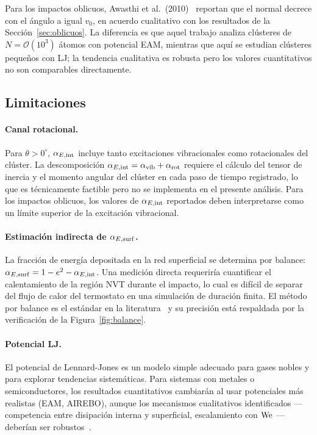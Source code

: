 Para los impactos oblicuos, Awasthi et al.\ (2010)~\cite{awasthi2010} reportan
que el \COR{} normal decrece con el ángulo a igual $v_0$, en acuerdo cualitativo
con los resultados de la Sección~\ref{sec:oblicuos}. La diferencia es que aquel
trabajo analiza clústeres de $N=\mathcal{O}(10^3)$ átomos con potencial EAM,
mientras que aquí se estudian clústeres pequeños con LJ; la tendencia cualitativa
es robusta pero los valores cuantitativos no son comparables directamente.

\subsection{Limitaciones}
\label{sec:limitaciones}

\paragraph{Canal rotacional.}
Para $\theta > 0^\circ$, $\alpha_{E,\mathrm{int}}$ incluye tanto excitaciones vibracionales
como rotacionales del clúster. La descomposición $\alpha_{E,\mathrm{int}} = \alpha_\mathrm{vib}
+ \alpha_\mathrm{rot}$ requiere el cálculo del tensor de inercia y el momento
angular del clúster en cada paso de tiempo registrado, lo que es
técnicamente factible pero no se implementa en el presente análisis. Para los
impactos oblicuos, los valores de $\alpha_{E,\mathrm{int}}$ reportados deben interpretarse
como un límite superior de la excitación vibracional.

\paragraph{Estimación indirecta de $\alpha_{E,\mathrm{surf}}$.}
La fracción de energía depositada en la red superficial se determina por balance:
$\alpha_{E,\mathrm{surf}} = 1 - e^2 - \alpha_{E,\mathrm{int}}$. Una medición directa requeriría cuantificar
el calentamiento de la región NVT durante el impacto, lo cual es difícil de separar
del flujo de calor del termostato en una simulación de duración finita. El método
por balance es el estándar en la literatura~\cite{awasthi2007} y su precisión
está respaldada por la verificación de la Figura~\ref{fig:balance}.

\paragraph{Potencial LJ.}
El potencial de Lennard-Jones es un modelo simple adecuado para gases nobles
y para explorar tendencias sistemáticas. Para sistemas con metales o
semiconductores, los resultados cuantitativos cambiarán al usar potenciales
más realistas (EAM, AIREBO), aunque los mecanismos cualitativos identificados
--- competencia entre disipación interna y superficial, escalamiento con $\mathrm{We}$ ---
deberían ser robustos~\cite{cleveland1992}.

